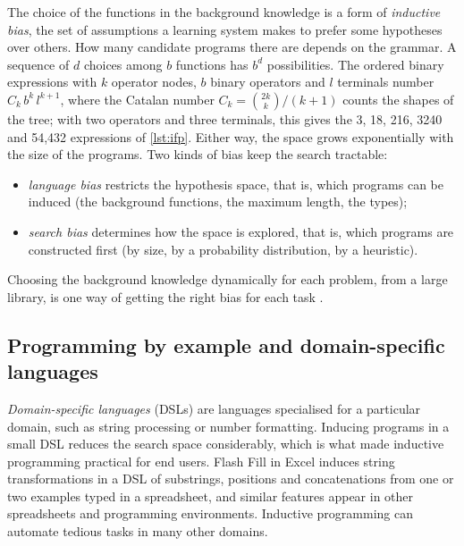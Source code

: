 The choice of the functions in the background knowledge is a form of \emph{inductive bias}, the set of
assumptions a learning system makes to prefer some hypotheses over others. How many candidate programs there are
depends on the grammar. A sequence of $d$ choices among $b$ functions has $b^d$ possibilities. The ordered binary expressions with $k$ operator nodes, $b$ binary operators and $l$ terminals number
$C_k\,b^k\,l^{k+1}$, where the Catalan number $C_k=\binom{2k}{k}/(k+1)$ counts the shapes of the tree; with two
operators and three terminals, this gives the 3, 18, 216, 3240 and 54,432 expressions of \cref{lst:ifp}.
Either way, the space grows exponentially with the size of the programs. Two kinds of bias keep the search tractable:
\begin{itemize}
  \item \emph{language bias} restricts the hypothesis space, that is, which programs can be induced (the
        background functions, the maximum length, the types);
  \item \emph{search bias} determines how the space is explored, that is, which programs are
        constructed first (by size, by a probability distribution, by a heuristic).
\end{itemize}
Choosing the background knowledge dynamically for each problem, from a large library, is one way of
getting the right bias for each task \citep{contrerasochando2019automated,contrerasochando2021towards}.

\subsection{Programming by example and domain-specific languages}

\emph{Domain-specific languages} (DSLs) are languages specialised for a particular domain, such as
string processing or number formatting. Inducing programs in a small DSL reduces the search space
considerably, which is what made inductive programming practical for end users. Flash Fill in Excel
\citep{gulwani2011automating} induces string transformations in a DSL of substrings, positions and
concatenations from one or two examples typed in a spreadsheet, and similar features appear in other
spreadsheets and programming environments. Inductive programming can automate tedious tasks in many other domains.

